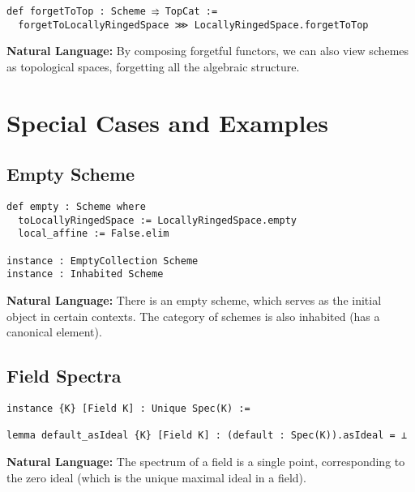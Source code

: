 \documentclass{article}
\theoremstyle{definition}
\begin{document}
\begin{lstlisting}
def forgetToTop : Scheme ⥤ TopCat :=
  forgetToLocallyRingedSpace ⋙ LocallyRingedSpace.forgetToTop
\end{lstlisting}

\textbf{Natural Language:} By composing forgetful functors, we can also view schemes as topological spaces, forgetting all the algebraic structure.

\section{Special Cases and Examples}

\subsection{Empty Scheme}

\begin{lstlisting}
def empty : Scheme where
  toLocallyRingedSpace := LocallyRingedSpace.empty
  local_affine := False.elim

instance : EmptyCollection Scheme
instance : Inhabited Scheme
\end{lstlisting}

\textbf{Natural Language:} There is an empty scheme, which serves as the initial object in certain contexts. The category of schemes is also inhabited (has a canonical element).

\subsection{Field Spectra}

\begin{lstlisting}
instance {K} [Field K] : Unique Spec(K) :=

lemma default_asIdeal {K} [Field K] : (default : Spec(K)).asIdeal = ⊥
\end{lstlisting}

\textbf{Natural Language:} The spectrum of a field is a single point, corresponding to the zero ideal (which is the unique maximal ideal in a field).
\end{document}
